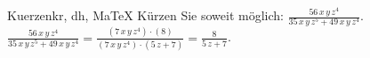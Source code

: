 \begin{MAufgabe}{Kuerzen}{kr, dh, MaTeX}
K\"urzen Sie soweit m\"oglich: $\frac{56\, x\, y\, z^4}{35\, x\, y\, z^5 + 49\, x\, y\, z^4}$.\\ 
\ifLsg\MLoesung
\quad $\frac{56\, x\, y\, z^4}{35\, x\, y\, z^5 + 49\, x\, y\, z^4}=\frac{(7\, x\, y\, z^4)\cdot(8)}{(7\, x\, y\, z^4)\cdot(5\, z + 7)}=\frac{8}{5\, z + 7}$.\else\relax\fi
 \end{MAufgabe}
